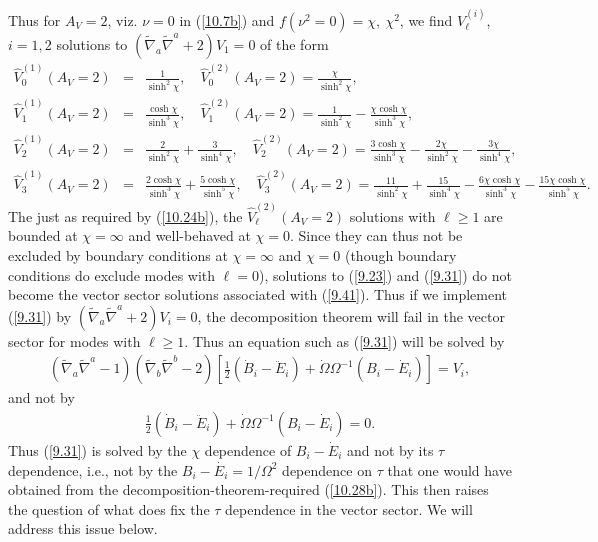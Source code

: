 \documentclass[aps,onecolumn,10pt]{revtex4}
\numberwithin{equation}{section}
\numberwithin{equation}{section}
\begin{document}
Thus for $A_V=2$, viz. $\nu=0$  in (\ref{10.7b}) and $f(\nu^2=0)=\chi,~\chi^2$,  we find $V^{(i)}_{\ell}$, $i=1,2$ solutions to $(\tilde{\nabla}_a\tilde{\nabla}^a+2)V_1=0$ of the form 
%
\begin{eqnarray}
\hat{V}^{(1)}_0(A_V=2)&=&\frac{1}{ \sinh^2\chi},\quad \hat{V}^{(2)}_0(A_V=2)=\frac{\chi }{ \sinh^2\chi},
\nonumber\\
\hat{V}^{(1)}_1(A_V=2)&=&\frac{\cosh \chi }{ \sinh^3\chi},\quad \hat{V}^{(2)}_1(A_V=2)=\frac{1}{ \sinh^2\chi}-\frac{\chi\cosh\chi}{ \sinh^3\chi},
\nonumber\\
\hat{V}^{(1)}_2(A_V=2)&=&\frac{2}{ \sinh^2\chi}+\frac{3}{\sinh^4\chi},\quad \hat{V}^{(2)}_2(A_V=2)=\frac{3\cosh\chi}{\sinh^3\chi}-\frac{2\chi}{\sinh^2\chi}-\frac{3\chi }{\sinh^4\chi},
\nonumber\\
\hat{V}^{(1)}_3(A_V=2)&=&\frac{2\cosh\chi}{\sinh^3\chi}+\frac{5\cosh\chi}{\sinh^5\chi},\quad \hat{V}^{(2)}_3(A_V=2)=\frac{11}{\sinh^2\chi}+\frac{15}{\sinh^4\chi}-\frac{6\chi\cosh\chi}{\sinh^3\chi}-\frac{15\chi\cosh\chi }{\sinh^5\chi}.~~~
\label{10.26b}
\end{eqnarray}
%
The just as required by (\ref{10.24b}), the $\hat{V}^{(2)}_{\ell}(A_V=2)$ solutions with $\ell \geq1$ are bounded at  $\chi=\infty$ and well-behaved at $\chi=0$. Since they can thus not be excluded by boundary conditions at $\chi=\infty$ and $\chi=0$ (though boundary conditions do exclude modes with $\ell=0$), solutions to (\ref{9.23}) and (\ref{9.31}) do not become the vector sector solutions associated with (\ref{9.41}). Thus if we implement (\ref{9.31}) by $(\tilde{\nabla}_a\tilde{\nabla}^a+2)V_i=0$, the  decomposition theorem will fail in the vector sector for modes with $\ell \geq 1$. Thus an equation such as (\ref{9.31}) 
will be solved by 
%
\begin{eqnarray}
(\tilde{\nabla}_a\tilde{\nabla}^a-1)(\tilde{\nabla}_b\tilde{\nabla}^b-2)\left[\tfrac{1}{2}(\dot{B}_i-\ddot{E}_i)+\dot{\Omega}\Omega^{-1}(B_i-\dot{E}_i)\right]=V_i,
\label{10.27b}
\end{eqnarray}
%
and not by
%
\begin{eqnarray}
\tfrac{1}{2}(\dot{B}_i-\ddot{E}_i)+\dot{\Omega}\Omega^{-1}(B_i-\dot{E}_i)=0.
\label{10.28b}
\end{eqnarray}
%
Thus (\ref{9.31}) is solved by the $\chi$ dependence of $B_i-\dot{E}_i$ and not by its $\tau$ dependence, i.e., not by the $B_i-\dot{E_i}=1/\Omega^2$ dependence on $\tau$ that one would have obtained from the decomposition-theorem-required (\ref{10.28b}). This then raises the question of what does fix the $\tau$ dependence in the vector sector. We will address this issue below.
\end{document}
